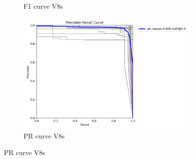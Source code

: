 \documentclass[letterpaper,11pt]{report}
\begin{document}
\begin{figure}[h!]
\begin{subfigure}[t]{0.4\textwidth}
        \caption{F1 curve V8s}
        \label{fig:image7}
    \end{subfigure}
    \hfill
    \begin{subfigure}[t]{0.4\textwidth}
        \centering
        \includegraphics[width=\textwidth]{PR_curve_v8s.png}
        \caption{PR curve V8s}
        \label{fig:image8}
    \end{subfigure}
    
    \vspace{0.5cm}
    

\end{figure}
\end{document}
